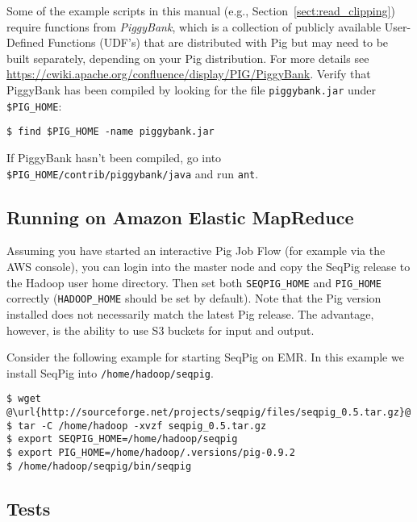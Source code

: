 Some of the example scripts in this manual (e.g.,
Section~\ref{sect:read_clipping}) require functions from \emph{PiggyBank},
which is a collection of publicly available User-Defined Functions (UDF's)
that are distributed with Pig but may need to be built separately, depending on
your Pig distribution.
For more details see
\url{https://cwiki.apache.org/confluence/display/PIG/PiggyBank}. Verify that
PiggyBank has been compiled by looking for the file {\tt piggybank.jar} under
{\tt \$PIG\_HOME}:
\begin{lstlisting} 
$ find $PIG_HOME -name piggybank.jar
\end{lstlisting}
If PiggyBank hasn't been compiled, go into {\tt
\$PIG\_HOME/contrib/piggybank/java} and run {\tt ant}.

\subsection{Running on Amazon Elastic MapReduce}

Assuming you have started an interactive Pig Job Flow (for example via
the AWS console), you can login into the master node and copy the SeqPig release to the Hadoop
user home directory. Then set both {\tt SEQPIG\_HOME} and {\tt PIG\_HOME}
correctly ({\tt HADOOP\_HOME} should be set by default). Note that the
Pig version installed does not necessarily match the latest Pig release.
The advantage, however, is the ability to use S3 buckets for input and
output.

Consider the following example for starting SeqPig on EMR. In this
example we install SeqPig into {\tt /home/hadoop/seqpig}.
\begin{lstlisting} 
$ wget @\url{http://sourceforge.net/projects/seqpig/files/seqpig_0.5.tar.gz}@
$ tar -C /home/hadoop -xvzf seqpig_0.5.tar.gz
$ export SEQPIG_HOME=/home/hadoop/seqpig
$ export PIG_HOME=/home/hadoop/.versions/pig-0.9.2
$ /home/hadoop/seqpig/bin/seqpig
\end{lstlisting}

\subsection{Tests}


